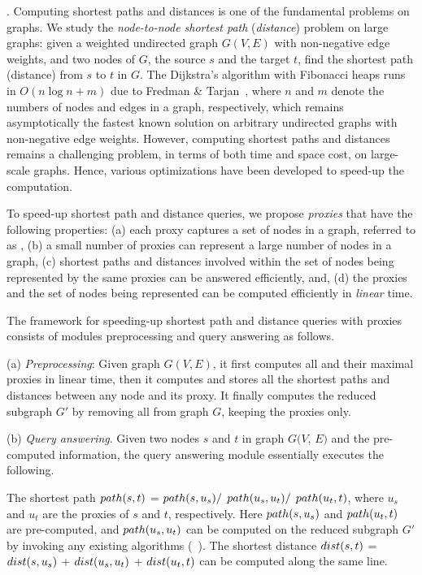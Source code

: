 . Computing shortest paths and distances is one of the fundamental problems on graphs. We study the {\em node-to-node shortest path} ({\em distance}) problem on large graphs: given a weighted undirected graph $G(V, E)$ with non-negative edge weights, and two nodes of $G$, the source $s$ and the target $t$, find the shortest path (distance) from $s$ to $t$ in $G$. The Dijkstra's algorithm with Fibonacci heaps runs in $O(n\log n + m)$ due to Fredman \& Tarjan~\cite{CormenLRS01}, where $n$ and $m$ denote the numbers of nodes and edges in a graph, respectively, which remains asymptotically the fastest known solution on arbitrary undirected graphs with non-negative edge weights.
However, computing shortest  paths and distances remains a challenging problem, in terms of both time and space cost, on large-scale graphs. Hence, various optimizations have been developed to speed-up the computation.

To speed-up shortest  path and distance queries, we propose {\em proxies} that have the following properties:
%
(a) each proxy captures a set of nodes in a graph, referred to as \dra,
%
(b) a small number of proxies can represent a large number of nodes in a graph,
%
(c) shortest paths and distances involved within the set of nodes being represented by the same proxies can be answered efficiently, and,
%
(d) the proxies and the set of nodes being represented can be computed efficiently in {\em linear} time.



The framework for speeding-up shortest path and distance queries with proxies consists of modules preprocessing and query answering as follows.


\ni(a) {\em Preprocessing}: Given graph $G(V, E)$, it first computes all \dras and their maximal proxies in linear time, then it computes and stores all the shortest paths and distances between any node and its proxy. It finally computes the reduced subgraph $G'$ by removing all \dras from graph $G$, \ie keeping the proxies only.


\ni(b) {\em Query answering}. Given two nodes $s$ and $t$ in graph $G(V$, $E)$  and the pre-computed information, the query answering module essentially executes the following.

The shortest path $\path(s, t)$ = $\path(s, u_s)/$ $\path(u_s, u_t)/$ $\path(u_t, t)$, where $u_s$ and $u_t$ are the proxies of $s$ and $t$, respectively.
Here  $\path(s, u_s)$ and $\path(u_t, t)$ are pre-computed, and $\path(u_s, u_t)$ can be computed on the reduced subgraph $G'$ by invoking any existing algorithms
(\eg \ah~\cite{zhu2013shortest}).
%
The shortest distance $\dist(s, t)$ = $\dist(s, u_s)$ + $\dist(u_s, u_t)$ + $\dist(u_t, t)$ can be computed along the same line.

